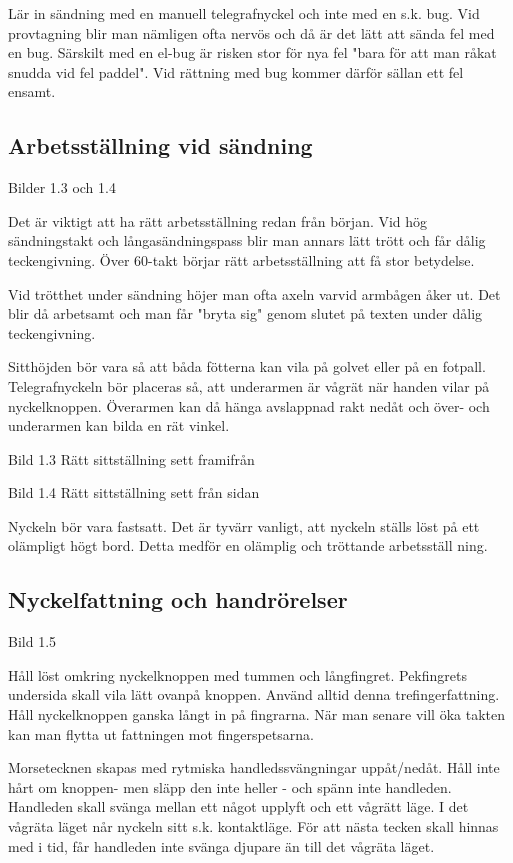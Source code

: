 \documentclass[a4paper,twoside,twocolumn,openright]{book}
\begin{document}
Lär in sändning med en manuell telegrafnyckel och inte med en s.k. bug. Vid provtagning blir man nämligen ofta nervös och då är det lätt att sända fel med en bug. Särskilt
med en el-bug är risken stor för nya fel "bara för att man råkat snudda vid fel paddel".
Vid rättning med bug kommer därför sällan ett fel ensamt.

\subsection{Arbetsställning vid sändning}

Bilder 1.3 och 1.4

Det är viktigt att ha rätt arbetsställning redan från början. Vid hög sändningstakt och
långasändningspass blir man annars lätt trött och får dålig teckengivning.
Över 60-takt börjar rätt arbetsställning att få stor betydelse.

Vid trötthet under sändning höjer man ofta axeln varvid armbågen åker ut. Det blir
då arbetsamt och man får "bryta sig" genom slutet på texten under dålig teckengivning.

Sitthöjden bör vara så att båda fötterna kan vila på golvet eller på en fotpall.
Telegrafnyckeln bör placeras så, att underarmen är vågrät när handen vilar på
nyckelknoppen. Överarmen kan då hänga avslappnad rakt nedåt och över- och underarmen kan
bilda en rät vinkel.

Bild 1.3 Rätt sittställning sett framifrån


Bild 1.4 Rätt sittställning sett från sidan

Nyckeln bör vara fastsatt. Det är tyvärr vanligt, att nyckeln ställs löst på ett olämpligt
högt bord. Detta medför en olämplig och tröttande arbetsställ ning.

\subsection{Nyckelfattning och handrörelser}

Bild 1.5

Håll löst omkring nyckelknoppen med tummen och långfingret. Pekfingrets undersida
skall vila lätt ovanpå knoppen. Använd alltid denna trefingerfattning. Håll nyckelknoppen
ganska långt in på fingrarna. När man senare vill öka takten kan man flytta ut fattningen mot fingerspetsarna.

Morsetecknen skapas med rytmiska handledssvängningar uppåt/nedåt. Håll inte
hårt om knoppen- men släpp den inte heller - och spänn inte handleden. Handleden
skall svänga mellan ett något upplyft och ett vågrätt läge. I det vågräta läget når
nyckeln sitt s.k. kontaktläge. För att nästa tecken skall hinnas med i tid, får handleden
inte svänga djupare än till det vågräta läget.
\end{document}
